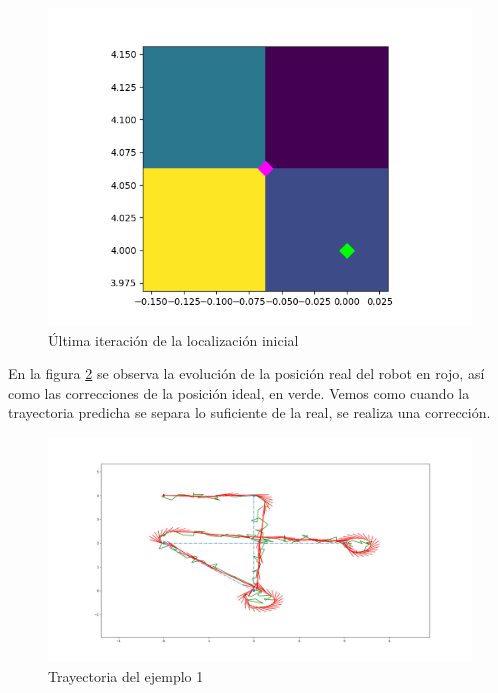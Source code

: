 \begin{figure}[htb]
  \centering
  \includegraphics[width=1\linewidth]{images/localizacion8.png}
  \caption{Última iteración de la localización inicial}
  \label{fig:localizacion_ej2}
\end{figure}

\bigskip En la figura \ref{fig:localizacion_ej3} se observa la evolución de la posición real del robot en rojo, así como las correcciones de la posición ideal, en verde. Vemos como cuando la trayectoria predicha se separa lo suficiente de la real, se realiza una corrección.

\begin{figure}[htb]
  \centering
  \includegraphics[width=1\linewidth]{images/localizacion9.png}
  \caption{Trayectoria del ejemplo 1}
  \label{fig:localizacion_ej3}
\end{figure}

